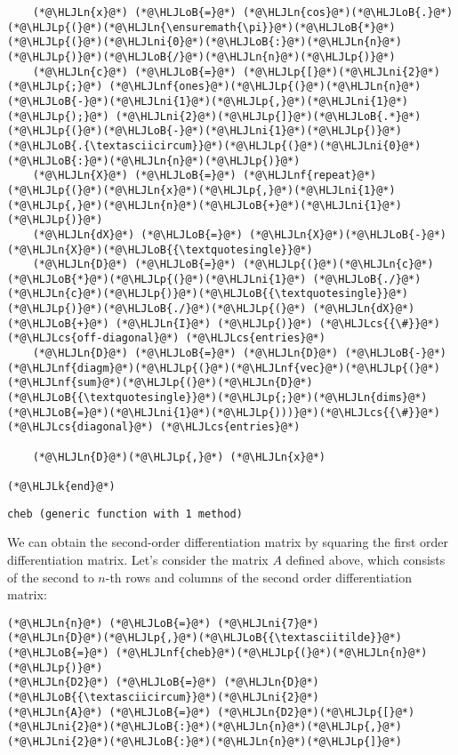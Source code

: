 \documentclass[12pt,landscape]{article}
\newcommand{\HLJLk}[1]{\textcolor[RGB]{148,91,176}{\textbf{#1}}}
\newcommand{\HLJLn}[1]{#1}
\newcommand{\HLJLnf}[1]{\textcolor[RGB]{66,102,213}{#1}}
\newcommand{\HLJLni}[1]{\textcolor[RGB]{59,151,46}{#1}}
\newcommand{\HLJLoB}[1]{\textcolor[RGB]{102,102,102}{\textbf{#1}}}
\newcommand{\HLJLp}[1]{#1}
\newcommand{\HLJLcs}[1]{\textcolor[RGB]{153,153,119}{\textit{#1}}}
\begin{document}
{\begin{lstlisting}
    (*@\HLJLn{x}@*) (*@\HLJLoB{=}@*) (*@\HLJLn{cos}@*)(*@\HLJLoB{.}@*)(*@\HLJLp{(}@*)(*@\HLJLn{\ensuremath{\pi}}@*)(*@\HLJLoB{*}@*)(*@\HLJLp{(}@*)(*@\HLJLni{0}@*)(*@\HLJLoB{:}@*)(*@\HLJLn{n}@*)(*@\HLJLp{)}@*)(*@\HLJLoB{/}@*)(*@\HLJLn{n}@*)(*@\HLJLp{)}@*)
    (*@\HLJLn{c}@*) (*@\HLJLoB{=}@*) (*@\HLJLp{[}@*)(*@\HLJLni{2}@*)(*@\HLJLp{;}@*) (*@\HLJLnf{ones}@*)(*@\HLJLp{(}@*)(*@\HLJLn{n}@*)(*@\HLJLoB{-}@*)(*@\HLJLni{1}@*)(*@\HLJLp{,}@*)(*@\HLJLni{1}@*)(*@\HLJLp{);}@*) (*@\HLJLni{2}@*)(*@\HLJLp{]}@*)(*@\HLJLoB{.*}@*)(*@\HLJLp{(}@*)(*@\HLJLoB{-}@*)(*@\HLJLni{1}@*)(*@\HLJLp{)}@*)(*@\HLJLoB{.{\textasciicircum}}@*)(*@\HLJLp{(}@*)(*@\HLJLni{0}@*)(*@\HLJLoB{:}@*)(*@\HLJLn{n}@*)(*@\HLJLp{)}@*)
    (*@\HLJLn{X}@*) (*@\HLJLoB{=}@*) (*@\HLJLnf{repeat}@*)(*@\HLJLp{(}@*)(*@\HLJLn{x}@*)(*@\HLJLp{,}@*)(*@\HLJLni{1}@*)(*@\HLJLp{,}@*)(*@\HLJLn{n}@*)(*@\HLJLoB{+}@*)(*@\HLJLni{1}@*)(*@\HLJLp{)}@*)
    (*@\HLJLn{dX}@*) (*@\HLJLoB{=}@*) (*@\HLJLn{X}@*)(*@\HLJLoB{-}@*)(*@\HLJLn{X}@*)(*@\HLJLoB{{\textquotesingle}}@*)
    (*@\HLJLn{D}@*) (*@\HLJLoB{=}@*) (*@\HLJLp{(}@*)(*@\HLJLn{c}@*)(*@\HLJLoB{*}@*)(*@\HLJLp{(}@*)(*@\HLJLni{1}@*) (*@\HLJLoB{./}@*)(*@\HLJLn{c}@*)(*@\HLJLp{)}@*)(*@\HLJLoB{{\textquotesingle}}@*)(*@\HLJLp{)}@*)(*@\HLJLoB{./}@*)(*@\HLJLp{(}@*) (*@\HLJLn{dX}@*) (*@\HLJLoB{+}@*) (*@\HLJLn{I}@*) (*@\HLJLp{)}@*) (*@\HLJLcs{{\#}}@*) (*@\HLJLcs{off-diagonal}@*) (*@\HLJLcs{entries}@*)
    (*@\HLJLn{D}@*) (*@\HLJLoB{=}@*) (*@\HLJLn{D}@*) (*@\HLJLoB{-}@*) (*@\HLJLnf{diagm}@*)(*@\HLJLp{(}@*)(*@\HLJLnf{vec}@*)(*@\HLJLp{(}@*)(*@\HLJLnf{sum}@*)(*@\HLJLp{(}@*)(*@\HLJLn{D}@*)(*@\HLJLoB{{\textquotesingle}}@*)(*@\HLJLp{;}@*)(*@\HLJLn{dims}@*)(*@\HLJLoB{=}@*)(*@\HLJLni{1}@*)(*@\HLJLp{)))}@*)(*@\HLJLcs{{\#}}@*) (*@\HLJLcs{diagonal}@*) (*@\HLJLcs{entries}@*)
    
    (*@\HLJLn{D}@*)(*@\HLJLp{,}@*) (*@\HLJLn{x}@*)

(*@\HLJLk{end}@*)
\end{lstlisting}

\begin{lstlisting}
cheb (generic function with 1 method)
\end{lstlisting}


We can obtain the second-order differentiation matrix by squaring the first order differentiation matrix.  Let's consider the matrix $A$ defined above, which consists of the second to $n$-th rows and columns of the second order differentiation matrix:


\begin{lstlisting}
(*@\HLJLn{n}@*) (*@\HLJLoB{=}@*) (*@\HLJLni{7}@*)
(*@\HLJLn{D}@*)(*@\HLJLp{,}@*)(*@\HLJLoB{{\textasciitilde}}@*) (*@\HLJLoB{=}@*) (*@\HLJLnf{cheb}@*)(*@\HLJLp{(}@*)(*@\HLJLn{n}@*)(*@\HLJLp{)}@*)
(*@\HLJLn{D2}@*) (*@\HLJLoB{=}@*) (*@\HLJLn{D}@*)(*@\HLJLoB{{\textasciicircum}}@*)(*@\HLJLni{2}@*)
(*@\HLJLn{A}@*) (*@\HLJLoB{=}@*) (*@\HLJLn{D2}@*)(*@\HLJLp{[}@*)(*@\HLJLni{2}@*)(*@\HLJLoB{:}@*)(*@\HLJLn{n}@*)(*@\HLJLp{,}@*)(*@\HLJLni{2}@*)(*@\HLJLoB{:}@*)(*@\HLJLn{n}@*)(*@\HLJLp{]}@*)
\end{lstlisting}

}
\end{document}
